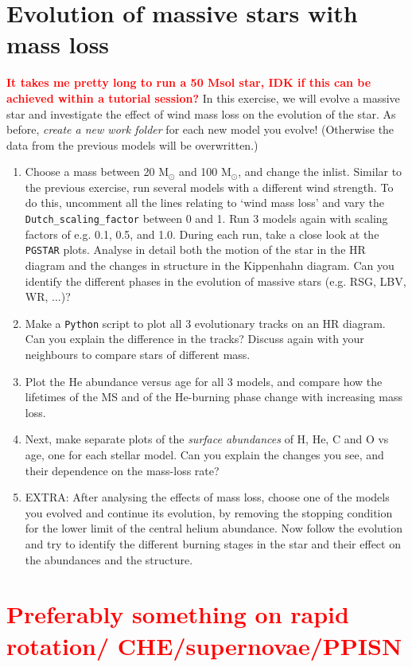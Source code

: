 \documentclass[11pt,a4paper]{article}
\newcommand{\todo}[1]{\textbf{\textcolor{red}{#1}}}
\begin{document}
\section{Evolution of massive stars with mass loss}

\todo{It takes me pretty long to run a 50 Msol star, IDK if this can be achieved within a tutorial session?}
In this exercise, we will evolve a massive star and investigate the effect of wind mass loss on the evolution of the star. As before, \emph{create a new work folder} for each new model you evolve! (Otherwise the data from the previous models will be overwritten.)
\begin{enumerate}
\item Choose a mass between 20 M$_\odot$ and 100 M$_\odot$, and change the inlist. Similar to the previous exercise, run several models with a different wind strength. To do this, uncomment all the lines relating to `wind mass loss' and vary the \verb|Dutch_scaling_factor| between 0 and 1. Run 3 models again with scaling factors of e.g. 0.1, 0.5, and 1.0. During each run, take a close look at the \texttt{PGSTAR} plots. Analyse in detail both the motion of the star in the HR diagram and the changes in structure in the Kippenhahn diagram. Can you identify the different phases in the evolution of massive stars (e.g. RSG, LBV, WR, ...)? %
\item Make a \texttt{Python} script to plot all 3 evolutionary tracks on an HR diagram. Can you explain the difference in the tracks? Discuss again with your neighbours to compare stars of different mass.
\item Plot the He abundance versus age for all 3 models, and compare how the lifetimes of the MS and of the He-burning phase change with increasing mass loss.
\item Next, make separate plots of the \emph{surface abundances} of H, He, C and O vs age, one for each stellar model. Can you explain the changes you see, and their dependence on the mass-loss rate?

\item EXTRA: After analysing the effects of mass loss, choose one of the models you evolved and continue its evolution, by removing the stopping condition for the lower limit of the central helium abundance. 
Now follow the evolution and try to identify the different burning stages in the star and their effect on the abundances and the structure. 
\end{enumerate}



\section{\todo{Preferably something on rapid rotation/ CHE/supernovae/PPISN}}



% 
% 
\end{document}
